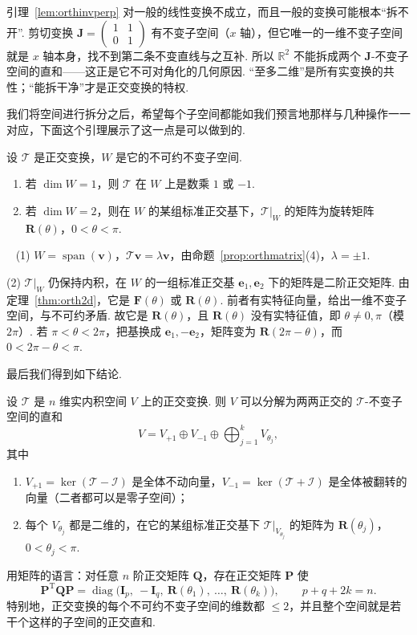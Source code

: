 \documentclass[lang=cn,10.5pt,scheme=chinese,toc=twocol,section,chinesefont=nofont,
twoside,citestyle=gb7714-2015,bibstyle=gb7714-2015]{elegantbook}
\DeclareRobustCommand{\textbf}[1]{{\lnsemiboldlatin\lnsemiboldcjk #1}}
\newcommand{\vv}[1]{\boldsymbol{#1}}
\newcommand{\trans}{\mathrm{T}}             %
\numberwithin{equation}{section}   %
\newcommand{\spn}{\operatorname{span}}      %
\newcommand{\diag}{\operatorname{diag}}
\newcommand*{\lnlabel}[1]{{\sffamily\bfseries\color{black}#1}}
\renewenvironment{proof}{%
	\par\noindent\lnlabel{\proofname}\;\ \color{black!90}\cfs}{\par}
\begin{document}
\begin{pitfallbox}
  引理~\ref{lem:orthinvperp} 对一般的线性变换不成立，而且一般的变换可能根本“拆不开”. 剪切变换 $\vv J=
    \begin{pmatrix}
      1 & 1 \\0&1
    \end{pmatrix}
  $ 有不变子空间（$x$ 轴），但它唯一的一维不变子空间就是 $x$ 轴本身，找不到第二条不变直线与之互补. 所以 $\mathbb{R}^2$ 不能拆成两个 $\vv J$-不变子空间的直和——这正是它不可对角化的几何原因. \textbf{“至多二维”是所有实变换的共性；“能拆干净”才是正交变换的特权.}
\end{pitfallbox}
我们将空间进行拆分之后，希望每个子空间都能如我们预言地那样与几种操作一一对应，下面这个引理展示了这一点是可以做到的.
\begin{lemma}
  \label{lem:orthpieces}
  设 $\mathscr T$ 是正交变换，$W$ 是它的不可约不变子空间.
  \begin{enumerate}
    \item 若 $\dim W=1$，则 $\mathscr T$ 在 $W$ 上是数乘 $1$ 或 $-1$.
    \item 若 $\dim W=2$，则在 $W$ 的某组标准正交基下，$\mathscr T|_W$ 的矩阵为旋转矩阵 $\vv R(\theta)$，$0<\theta<\pi$.
  \end{enumerate}
\end{lemma}
\begin{proof}
  (1) $W=\spn(\vv v)$，$\mathscr T\vv v=\lambda\vv v$，由命题~\ref{prop:orthmatrix}(4)，$\lambda=\pm1$.

  (2) $\mathscr T|_W$ 仍保持内积，在 $W$ 的一组标准正交基 $\vv e_1,\vv e_2$ 下的矩阵是二阶正交矩阵. 由定理~\ref{thm:orth2d}，它是 $\vv F(\theta)$ 或 $\vv R(\theta)$. 前者有实特征向量，给出一维不变子空间，与不可约矛盾. 故它是 $\vv R(\theta)$，且 $\vv R(\theta)$ 没有实特征值，即 $\theta\ne0,\pi$（模 $2\pi$）. 若 $\pi<\theta<2\pi$，把基换成 $\vv e_1,-\vv e_2$，矩阵变为 $\vv R(2\pi-\theta)$，而 $0<2\pi-\theta<\pi$.
\end{proof}
最后我们得到如下结论.
\begin{theorem}[实正交变换的结构定理]\label{thm:orthcanon}
  设 $\mathscr T$ 是 $n$ 维实内积空间 $V$ 上的正交变换. 则 $V$ 可以分解为两两正交的 $\mathscr T$-不变子空间的直和
  \[V=V_{+1}\oplus V_{-1}\oplus\bigoplus_{j=1}^kV_{\theta_j},\]
  其中
  \begin{enumerate}
    \item $V_{+1}=\ker(\mathscr T-\mathscr I)$ 是全体不动向量，$V_{-1}=\ker(\mathscr T+\mathscr I)$ 是全体被翻转的向量（二者都可以是零子空间）；
    \item 每个 $V_{\theta_j}$ 都是二维的，在它的某组标准正交基下 $\mathscr T|_{V_{\theta_j}}$ 的矩阵为 $\vv R(\theta_j)$，$0<\theta_j<\pi$.
  \end{enumerate}
  用矩阵的语言：对任意 $n$ 阶正交矩阵 $\vv Q$，存在正交矩阵 $\vv P$ 使
  \[\vv P^\trans\vv Q\vv P=\diag\big(\vv I_p,\ -\vv I_q,\ \vv R(\theta_1),\ \ldots,\ \vv R(\theta_k)\big),\qquad p+q+2k=n.\]
  特别地，正交变换的每个不可约不变子空间的维数都 $\le2$，并且整个空间就是若干个这样的子空间的正交直和.
\end{theorem}
\end{document}
